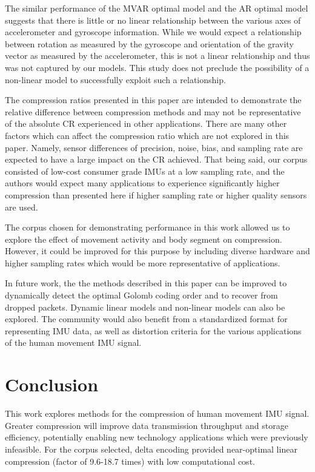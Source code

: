 \documentclass[journal]{IEEEtran}
\begin{document}
The similar performance of the MVAR optimal model and the AR optimal model suggests that there is little or no linear relationship between the various axes of accelerometer and gyroscope information. While we would expect a relationship between rotation as measured by the gyroscope and orientation of the gravity vector as measured by the accelerometer, this is not a linear relationship and thus was not captured by our models. This study does not preclude the possibility of a non-linear model to successfully exploit such a relationship.

The compression ratios presented in this paper are intended to demonstrate the relative difference between compression methods and may not be representative of the absolute CR experienced in other applications. There are many other factors which can affect the compression ratio which are not explored in this paper. Namely, sensor differences of precision, noise, bias, and sampling rate are expected to have a large impact on the CR achieved. That being said, our corpus consisted of low-cost consumer grade IMUs at a low sampling rate, and the authors would expect many applications to experience significantly higher compression than presented here if higher sampling rate or higher quality sensors are used.

The corpus chosen for demonstrating performance in this work allowed us to explore the effect of movement activity and body segment on compression. However, it could be improved for this purpose by including diverse hardware and higher sampling rates which would be more representative of applications.

In future work, the the methods described in this paper can be improved to dynamically detect the optimal Golomb coding order and to recover from dropped packets. Dynamic linear models and non-linear models can also be explored. The community would also benefit from a standardized format for representing IMU data, as well as distortion criteria for the various applications of the human movement IMU signal.

\section{Conclusion}
This work explores methods for the compression of human movement IMU signal. Greater compression will improve data transmission throughput and storage efficiency, potentially enabling new technology applications which were previously infeasible. For the corpus selected, delta encoding provided near-optimal linear compression (factor of 9.6-18.7 times) with low computational cost.
\end{document}
